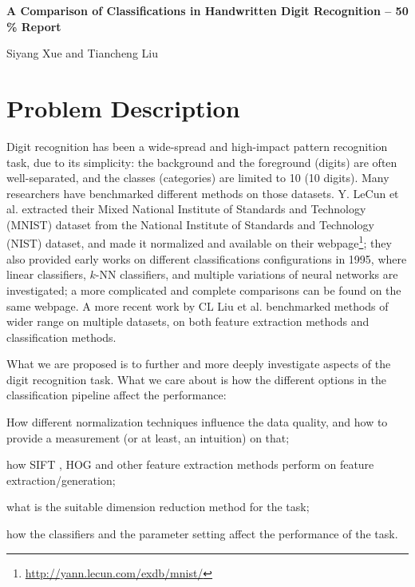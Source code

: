 \documentclass[12pt]{article}
\newenvironment{nscenter}
 {\parskip=0pt\par\nopagebreak\centering}
 {\par\noindent\ignorespacesafterend}
\begin{document}
\thispagestyle{empty}

\bigskip
\bigskip

\begin{nscenter}
\textbf{\Large{A Comparison of Classifications in Handwritten Digit Recognition -- 50 \% Report}}
\end{nscenter}

\bigskip

\begin{nscenter}
{Siyang Xue and Tiancheng Liu}
\end{nscenter}


\section{Problem Description}
\label{sec:problem}


Digit recognition has been a wide-spread and high-impact pattern recognition task, due to its simplicity: the background and the foreground (digits) are often well-separated, and the classes (categories) are limited to 10 (10 digits). Many researchers have benchmarked different methods on those datasets. Y. LeCun et al.\cite{lecun1998gradient} extracted their Mixed National Institute of Standards and Technology (MNIST) dataset from the National Institute of Standards and Technology (NIST) dataset, and made it normalized and available on their webpage\footnote{\url{http://yann.lecun.com/exdb/mnist/}}; they also provided early works on different classifications configurations in 1995, where linear classifiers, $k$-NN classifiers, and multiple variations of neural networks are investigated; a more complicated and complete comparisons can be found on the same webpage. A more recent work by CL Liu et al.\cite{liu2003handwritten} benchmarked methods of wider range on multiple datasets, on both feature extraction methods and classification methods.

What we are proposed is to further and more deeply investigate aspects of the digit recognition task. What we care about is how the different options in the classification pipeline affect the performance:
\begin{inparaenum} 
\item How different normalization techniques influence the data quality, and how to provide a measurement (or at least, an intuition) on that;
\item how SIFT \cite{lowe2004distinctive}, HOG \cite{dalal2005histograms} and other feature extraction methods perform on feature extraction/generation; 
\item what is the suitable dimension reduction method for the task;
\item how the classifiers and the parameter setting affect the performance of the task.
\end{inparaenum} 
\end{document}
